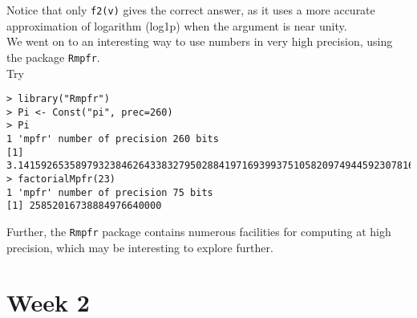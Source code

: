\documentclass[11pt,a4paper]{article}
\begin{document}
Notice that only \texttt{f2(v)} gives the correct answer, as it uses a more accurate approximation of logarithm (log1p) when the argument is near unity.\\
We went on to an interesting way to use numbers in very high precision, using the package \texttt{Rmpfr}.\\
Try 
\begin{verbatim}
> library("Rmpfr")
> Pi <- Const("pi", prec=260)
> Pi
1 'mpfr' number of precision 260 bits
[1] 3.141592653589793238462643383279502884197169399375105820974944592307816406286208
> factorialMpfr(23)
1 'mpfr' number of precision 75 bits
[1] 25852016738884976640000
\end{verbatim}
Further, the \texttt{Rmpfr} package contains numerous facilities for computing at high precision, which may be interesting to explore further.

\section*{Week 2}
\end{document}
